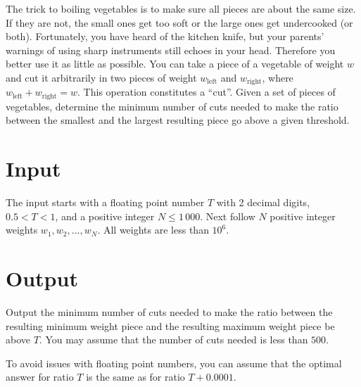 

The trick to boiling vegetables is to make sure all pieces are about the same size. If they are not,
the small ones get too soft or the large ones get undercooked (or both). Fortunately, you have heard
of the kitchen knife, but your parents' warnings of using sharp instruments still echoes in your
head. Therefore you better use it as little as possible. You can take a piece of a vegetable of
weight $w$ and cut it arbitrarily in two pieces of weight $w_\text{left}$ and $w_\text{right}$, where
$w_\text{left}+w_\text{right}=w$. This operation constitutes a ``cut''. Given a set of pieces of vegetables,
determine the minimum number of cuts needed to make the ratio between the smallest and the largest
resulting piece go above a given threshold.

\section*{Input}
The input starts with a floating point number $T$ with 2 decimal digits, $0.5<T<1$, and a positive integer $N\le 1\,000$. Next
follow $N$ positive integer weights $w_1,w_2,...,w_N$. All weights are less than $10^6$.

\section*{Output}
Output the minimum number of cuts needed to make the ratio between the resulting minimum weight piece and
the resulting maximum weight piece be above $T$. You may assume that the number of cuts needed is
less than $500$.

To avoid issues with floating point numbers, you can assume that the optimal answer for ratio $T$ is
the same as for ratio $T + 0.0001$.
